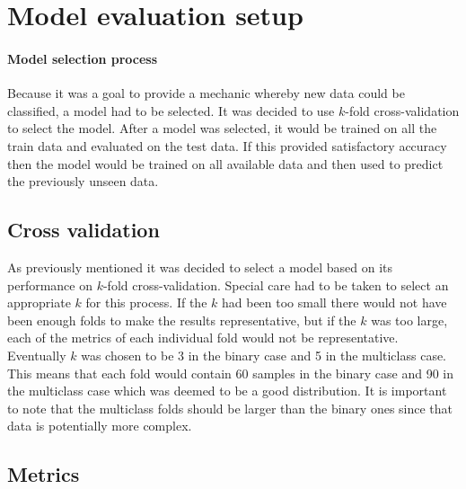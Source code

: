 \documentclass[british]{article}
\begin{document}
	
	\section{Model evaluation setup}
	\paragraph{Model selection process} Because it was a goal to provide a mechanic whereby new data could be classified, a model had to be selected. It was decided to use $k$-fold cross-validation to select the model. After a model was selected, it would be trained on all the train data and evaluated on the test data. If this provided satisfactory accuracy then the model would be trained on all available data and then used to predict the previously unseen data. 
	
	\subsection{Cross validation} As previously mentioned it was decided to select a model based on its performance on $k$-fold cross-validation. Special care had to be taken to select an appropriate $k$ for this process. If the $k$ had been too small there would not have been enough folds to make the results representative, but if the $k$ was too large, each of the metrics of each individual fold would not be representative. Eventually $k$ was chosen to be 3 in the binary case and 5 in the multiclass case. This means that each fold would contain 60 samples in the binary case and 90 in the multiclass case which was deemed to be a good distribution. It is important to note that the multiclass folds should be larger than the binary ones since that data is potentially more complex. 
	
	\subsection{Metrics}
	\label{metrics} 
	
\end{document}
